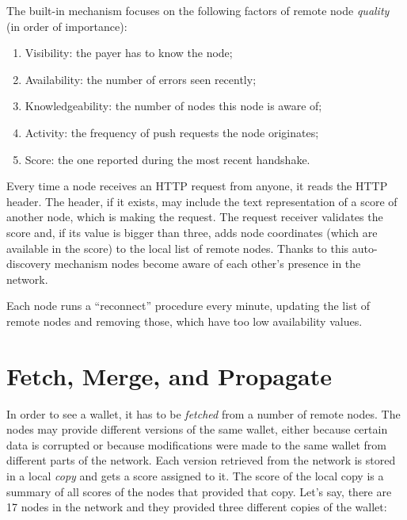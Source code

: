 \documentclass{main}
\begin{document}
The built-in mechanism focuses on the following factors of
remote node \emph{quality} (in order of importance):

\begin{enumerate}
  \item Visibility: the payer has to know the node;
  \item Availability: the number of errors seen recently;
  \item Knowledgeability: the number of nodes this node is aware of;
  \item Activity: the frequency of push requests the node originates;
  \item Score: the one reported during the most recent handshake.
\end{enumerate}

Every time a node receives an HTTP request from anyone, it reads the
 HTTP header. The header, if it exists, may include
the text representation of a score of another node, which is making
the request. The request receiver validates the score and, if its
value is bigger than three, adds node coordinates (which are
available in the score) to the local list of remote nodes. Thanks to this
auto-discovery mechanism nodes become aware of each other's presence
in the network.

Each node runs a ``reconnect'' procedure every minute, updating the list
of remote nodes and removing those, which have too low availability values.

\section{Fetch, Merge, and Propagate}\label{sec:fetch}

In order to see a wallet, it has to be \emph{fetched} from a number of remote
nodes. The nodes may provide different versions of the same wallet, either
because certain data is corrupted or because modifications were made to the same
wallet from different parts of the network. Each version retrieved from the
network is stored in a local \emph{copy} and gets a score assigned to it.
The score of the local copy is a summary of all scores of the nodes that
provided that copy. Let's say, there are 17 nodes in the network and they
provided three different copies of the wallet:
\end{document}
